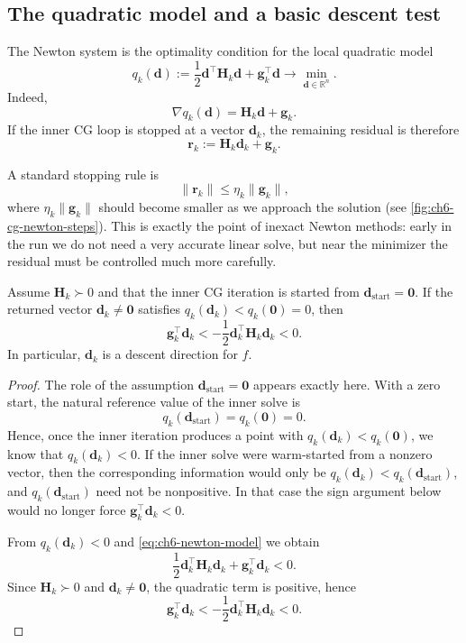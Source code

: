 \subsection{The quadratic model and a basic descent test}
The Newton system is the optimality condition for the local
quadratic model
\begin{equation}
  \label{eq:ch6-newton-model}
  q_k(\mathbf{d})
  :=\frac12 \mathbf{d}^{\top}\mathbf{H}_k\mathbf{d}
  +\mathbf{g}_k^{\top}\mathbf{d}
  \to \min_{\mathbf{d}\in\mathbb{R}^n}.
\end{equation}
Indeed,
\[
  \nabla q_k(\mathbf{d})=\mathbf{H}_k\mathbf{d}+\mathbf{g}_k.
\]
If the inner CG loop is stopped at a vector $\mathbf{d}_k$, the remaining
residual is therefore
\begin{equation}
  \label{eq:ch6-residual}
  \mathbf{r}_k:=\mathbf{H}_k\mathbf{d}_k+\mathbf{g}_k.
\end{equation}

A standard stopping rule is
\begin{equation}
  \label{eq:ch6-forcing-criterion}
  \|\mathbf{r}_k\|\le \eta_k \|\mathbf{g}_k\|,
\end{equation}
where $\eta_k \|\mathbf{g}_k\|$ should become smaller as we approach the
solution (see \cref{fig:ch6-cg-newton-steps}). 
This is exactly the point of inexact Newton methods: early in the run
we do not need a very accurate linear solve, but near the minimizer the
residual must be controlled much more carefully.

\begin{claim}
\label{clm:ch6-hfn-descent}
Assume $\mathbf{H}_k\succ 0$ and that the inner CG iteration is started from
$\mathbf{d}_{\mathrm{start}}=\mathbf{0}$. If the returned vector
$\mathbf{d}_k\neq \mathbf{0}$ satisfies
$q_k(\mathbf{d}_k)<q_k(\mathbf{0})=0$, then
\[
  \mathbf{g}_k^{\top}\mathbf{d}_k
  <-\frac12 \mathbf{d}_k^{\top}\mathbf{H}_k\mathbf{d}_k<0.
\]
In particular, $\mathbf{d}_k$ is a descent direction for $f$.
\end{claim}
\begin{proof}
The role of the assumption $\mathbf{d}_{\mathrm{start}}=\mathbf{0}$ appears
exactly here. With a zero start, the natural reference value of the inner solve
is
\[
  q_k(\mathbf{d}_{\mathrm{start}})=q_k(\mathbf{0})=0.
\]
Hence, once the inner iteration produces a point with
$q_k(\mathbf{d}_k)<q_k(\mathbf{0})$, we know that
$q_k(\mathbf{d}_k)<0$. If the inner solve were warm-started from a nonzero
vector, then the corresponding information would only be
$q_k(\mathbf{d}_k)<q_k(\mathbf{d}_{\mathrm{start}})$, and
$q_k(\mathbf{d}_{\mathrm{start}})$ need not be nonpositive. In that case the
sign argument below would no longer force
$\mathbf{g}_k^\top\mathbf{d}_k<0$.

From $q_k(\mathbf{d}_k)<0$ and \eqref{eq:ch6-newton-model} we obtain
\[
  \frac12 \mathbf{d}_k^{\top}\mathbf{H}_k\mathbf{d}_k
  +\mathbf{g}_k^{\top}\mathbf{d}_k<0.
\]
Since $\mathbf{H}_k\succ 0$ and $\mathbf{d}_k\neq \mathbf{0}$, the quadratic
term is positive, hence
\[
  \mathbf{g}_k^{\top}\mathbf{d}_k
  <-\frac12 \mathbf{d}_k^{\top}\mathbf{H}_k\mathbf{d}_k<0.
\]
\end{proof}

